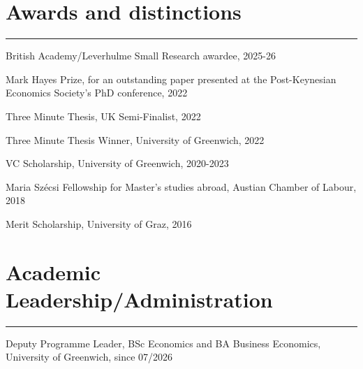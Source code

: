 \documentclass[letterpaper]{article}
\renewenvironment{itemize}{
  \begin{list}{}
    { \setlength{\itemsep}{5pt}
      \setlength{\parsep}{0pt}
      \setlength{\topsep}{0pt}
      \setlength{\leftmargin}{0em} } }{
  \end{list}}
\begin{document}
\section*{Awards and distinctions}
\hrule
\vspace{2mm}
\begin{itemize}
    \item British Academy/Leverhulme Small Research awardee, 2025-26 
    \item Mark Hayes Prize, for an outstanding paper presented at the Post-Keynesian Economics Society's PhD conference, 2022 
    \item Three Minute Thesis, UK Semi-Finalist, 2022 
    \item Three Minute Thesis Winner, University of Greenwich, 2022
    \item VC Scholarship, University of Greenwich, 2020-2023
    \item Maria Szécsi Fellowship for Master’s studies abroad, Austian Chamber of Labour, 2018 
    \item Merit Scholarship, University of Graz, 2016
\end{itemize}

\section*{Academic Leadership/Administration}
\hrule 
\vspace{2mm}
\begin{itemize}
    \item Deputy Programme Leader, BSc Economics and BA Business Economics, University of Greenwich, since 07/2026
\end{itemize}
\end{document}
